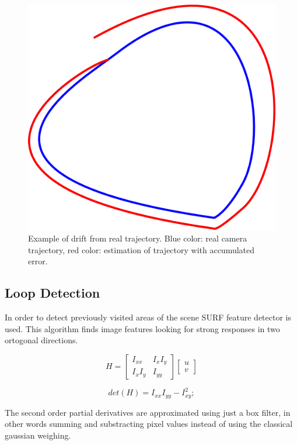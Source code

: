 \begin{figure}[!h]
\begin{center}
\includegraphics[scale=0.35]{images/drift}
\caption{Example of drift from real trajectory. Blue color: real camera trajectory, red color: estimation of trajectory with accumulated error.}
\end{center}
\end{figure}

\subsection{Loop Detection}

In order to detect previously visited areas of the scene SURF \cite{Bay06surf} feature detector 
is used. This algorithm finds image features looking for strong responses in two ortogonal directions. 


$$
H = \begin{bmatrix} I_{xx} & I_x I_y \\ I_x I_y & I_{yy} \end{bmatrix} \begin{bmatrix} u \\ v \end{bmatrix}
$$

$$
det(H) = I_{xx} I_{yy} - I_{xy}^2;
$$


The second order partial derivatives are approximated using just a box filter, in other words 
summing and substracting pixel values instead of using the classical gaussian weighing. 

